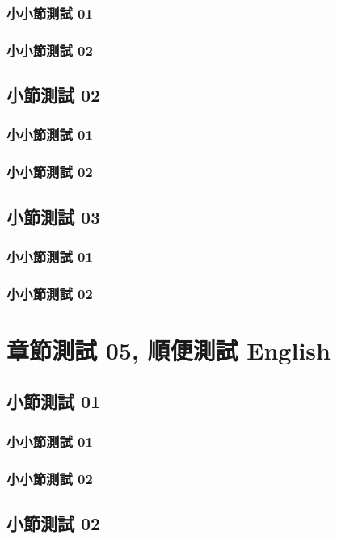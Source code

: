     \subsection{小小節測試 01}
    \lipsum[23]
    \subsection{小小節測試 02}
    \lipsum[23]
    \section{小節測試 02}
    \lipsum[23]
    \subsection{小小節測試 01}
    \lipsum[23]
    \subsection{小小節測試 02}
    \lipsum[23]
    \section{小節測試 03}
    \lipsum[23]
    \subsection{小小節測試 01}
    \lipsum[23]
    \subsection{小小節測試 02}
    \lipsum[23]

\chapter{章節測試 05, 順便測試 English}
    \section{小節測試 01}
    \lipsum[23]
    \subsection{小小節測試 01}
    \lipsum[23]
    \subsection{小小節測試 02}
    \lipsum[23]
    \section{小節測試 02}
    \lipsum[23]
